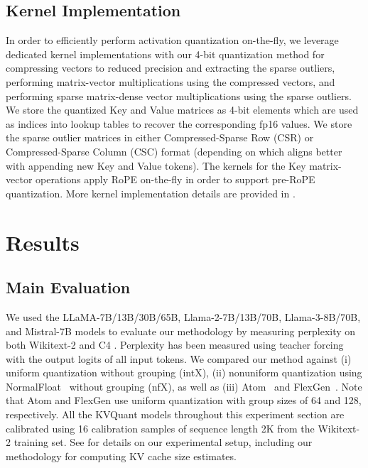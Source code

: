 \subsection{Kernel Implementation}

\label{sec:kernel-imp}

In order to efficiently perform activation quantization on-the-fly, we leverage dedicated kernel implementations with our 4-bit quantization method for compressing vectors to reduced precision and extracting the sparse outliers, performing matrix-vector multiplications using the compressed vectors, and performing sparse matrix-dense vector multiplications using the sparse outliers. We store the quantized Key and Value matrices as 4-bit elements which are used as indices into lookup tables to recover the corresponding fp16 values. We store the sparse outlier matrices in either Compressed-Sparse Row (CSR) or Compressed-Sparse Column (CSC) format (depending on which aligns better with appending new Key and Value tokens). The kernels for the Key matrix-vector operations apply RoPE on-the-fly in order to support pre-RoPE quantization. More kernel implementation details are provided in .

\section{Results}
\label{sec:results}

\subsection{Main Evaluation}
\label{sec:results-ppl}

We used the LLaMA-7B/13B/30B/65B, Llama-2-7B/13B/70B, Llama-3-8B/70B, and Mistral-7B models to evaluate our methodology by measuring perplexity on both Wikitext-2 and C4  \cite{touvron2023llama,touvron2023llama2,llama3modelcard,jiang2023mistral,wikitext2,c4}. Perplexity has been measured using teacher forcing with the output logits of all input tokens. We compared our method against (i) uniform quantization without grouping (intX), (ii) nonuniform quantization using NormalFloat~\cite{dettmers2023qlora} without grouping (nfX), as well as (iii) Atom~\cite{zhao2023atom} and FlexGen~\cite{sheng2023flexgen}. Note that Atom and FlexGen use uniform quantization with group sizes of 64 and 128, respectively. All the {KVQuant} models throughout this experiment section are calibrated using 16 calibration samples of sequence length 2K from the Wikitext-2 training set. See  for details on our experimental setup, including our methodology for computing KV cache size estimates.


